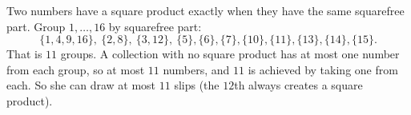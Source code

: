 Two numbers have a square product exactly when they have the same squarefree part. Group $1,\dots,16$ by squarefree part:
\[\{1,4,9,16\},\ \{2,8\},\ \{3,12\},\ \{5\},\{6\},\{7\},\{10\},\{11\},\{13\},\{14\},\{15\}.\]
That is $11$ groups. A collection with no square product has at most one number from each group, so at most $11$ numbers, and $11$ is achieved by taking one from each. So she can draw at most $\boxed{11}$ slips (the $12$th always creates a square product).
